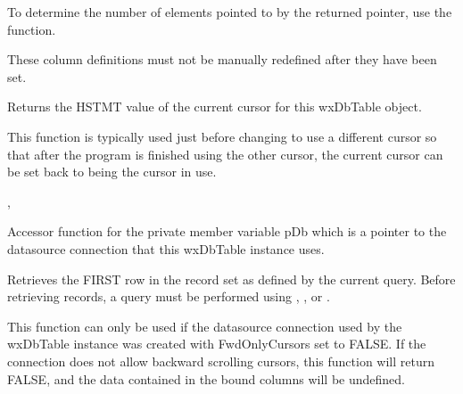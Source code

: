 To determine the number of elements pointed to by the returned 
 pointer, use the 
 function.


These column definitions must not be manually redefined after they have been 
set.


\label{wxdbtablegetcursor}


Returns the HSTMT value of the current cursor for this wxDbTable object.  


This function is typically used just before changing to use a different cursor 
so that after the program is finished using the other cursor, the current 
cursor can be set back to being the cursor in use.


, 


\label{wxdbtablegetdb}


Accessor function for the private member variable pDb which is a pointer to 
the datasource connection that this wxDbTable instance uses.


\label{wxdbtablegetfirst}


Retrieves the FIRST row in the record set as defined by the current query.  
Before retrieving records, a query must be performed using 
, 
, 
 or 
.


This function can only be used if the datasource connection used by the 
wxDbTable instance was created with FwdOnlyCursors set to FALSE.  If the 
connection does not allow backward scrolling cursors, this function will 
return FALSE, and the data contained in the bound columns will be undefined.


